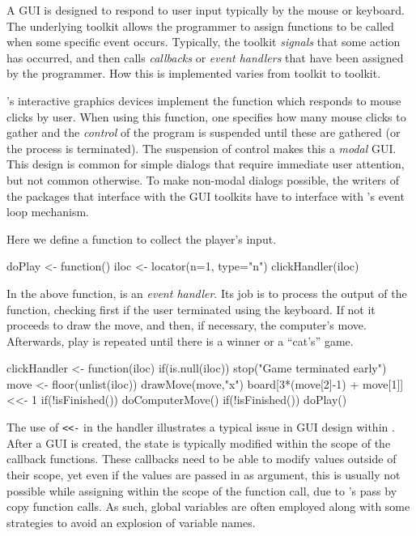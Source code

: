 A GUI is designed to respond to user input typically by the mouse or
keyboard. The underlying toolkit allows the programmer to assign
functions to be called when some specific event occurs. Typically, the
toolkit \textit{signals} that some action has occurred, and then
calls \textit{callbacks} or \textit{event handlers} that have been
assigned by the programmer. How this is implemented varies from
toolkit to toolkit.

\R's interactive graphics devices implement the 
function which responds to mouse clicks by user. When using this function,
one specifies how many mouse clicks to gather and the \textit{control}
of the program is suspended until these are gathered (or the process
is terminated). The suspension of control makes this a \textit{modal}
GUI. This design is common for simple dialogs that require immediate
user attention, but not common otherwise. To make non-modal dialogs
possible, the writers of the \R\/ packages that interface with the GUI
toolkits have to interface with \R's event loop mechanism.


Here we define a function to collect the player's input.
\begin{Schunk}
\begin{Sinput}
 doPlay <- function() {
   iloc <- locator(n=1, type="n")
   clickHandler(iloc)
 }
\end{Sinput}
\end{Schunk}

In the above function,
 is an \textit{event handler}. Its job is to process the output of the
 function, checking first if the user terminated
 using the keyboard. If not it proceeds to draw the
move, and then, if necessary, the computer's move. Afterwards, play is
repeated until there is a winner or a ``cat's'' game. 


\begin{Schunk}
\begin{Sinput}
 clickHandler <- function(iloc) {
   if(is.null(iloc)) 
     stop("Game terminated early")
   move <- floor(unlist(iloc))
   drawMove(move,"x")
   board[3*(move[2]-1) + move[1]] <<- 1
   if(!isFinished()) 
     doComputerMove()
   if(!isFinished()) 
     doPlay()
 }
\end{Sinput}
\end{Schunk}

The use of \verb+<<-+ in the handler illustrates a typical issue in
GUI design within \R. After a GUI is created, the state is
typically modified within the scope of the callback functions. These
callbacks need to be able to modify values outside of their scope, yet
even if the values are passed in as argument, this is usually not
possible while assigning within the scope of the function call, due to
\R's pass by copy function calls. As such, global variables are often
employed along with some strategies to avoid an explosion of variable
names.

